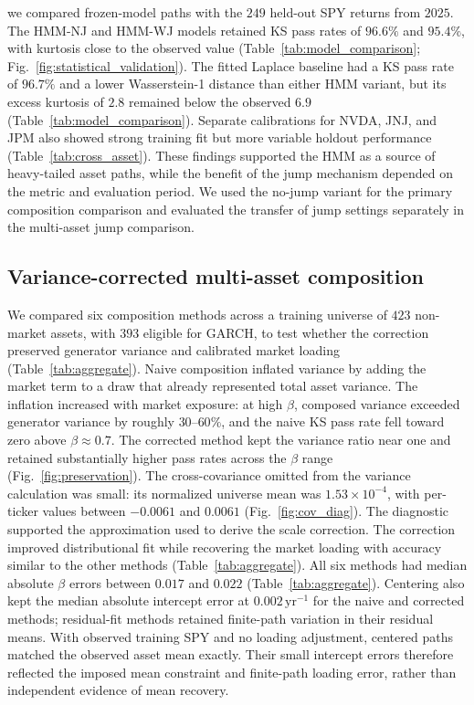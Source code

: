 we compared frozen-model paths with the $249$ held-out SPY returns
from $2025$. The HMM-NJ and HMM-WJ models retained KS pass rates of
$96.6\%$ and $95.4\%$, with kurtosis close to the observed value
(Table~\ref{tab:model_comparison};
Fig.~\ref{fig:statistical_validation}). The fitted Laplace
baseline had a KS pass rate of $96.7\%$ and a lower Wasserstein-1
distance than either HMM variant, but its excess kurtosis of $2.8$
remained below the observed $6.9$ (Table~\ref{tab:model_comparison}).
Separate calibrations for
NVDA, JNJ, and JPM also showed strong training fit but more variable
holdout performance (Table~\ref{tab:cross_asset}). These findings
supported the HMM as a source of heavy-tailed asset paths, while the
benefit of the jump mechanism depended on the metric and evaluation
period. We used the no-jump variant for the primary composition
comparison and evaluated the transfer of jump settings separately
in the multi-asset jump comparison.


\subsection{Variance-corrected multi-asset composition}

We compared six composition methods across a training universe of
$423$ non-market assets, with $393$ eligible for GARCH, to test
whether the correction preserved generator variance and
calibrated market loading (Table~\ref{tab:aggregate}). Naive
composition inflated variance by adding the market term to a draw
that already represented total asset variance. The inflation increased
with market exposure: at high $\beta$, composed variance exceeded
generator variance by roughly $30$--$60\%$, and the naive KS pass rate fell
toward zero above $\beta\approx0.7$. The corrected method kept the
variance ratio near one and retained substantially higher pass rates
across the $\beta$ range (Fig.~\ref{fig:preservation}). The
cross-covariance omitted from the variance calculation was small:
its normalized universe mean was $1.53\times10^{-4}$, with per-ticker
values between $-0.0061$ and $0.0061$
(Fig.~\ref{fig:cov_diag}). The diagnostic supported the approximation
used to derive the scale correction.
The correction improved distributional fit while recovering the
market loading with accuracy similar to the other methods
(Table~\ref{tab:aggregate}).
All six methods had median absolute $\beta$ errors between $0.017$
and $0.022$ (Table~\ref{tab:aggregate}). Centering also kept the
median absolute intercept error at $0.002\,\mathrm{yr}^{-1}$ for
the naive and corrected methods; residual-fit methods retained
finite-path variation in their residual means. With observed training
SPY and no loading adjustment, centered paths matched the observed
asset mean exactly. Their small intercept errors therefore reflected
the imposed mean constraint and finite-path loading error, rather
than independent evidence of mean recovery.

